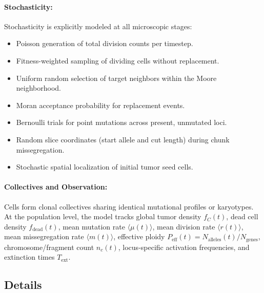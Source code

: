 \documentclass[11pt,a4paper]{article}
\begin{document}
\paragraph{Stochasticity:}
Stochasticity is explicitly modeled at all microscopic stages:
\begin{itemize}
    \item Poisson generation of total division counts per timestep.
    \item Fitness-weighted sampling of dividing cells without replacement.
    \item Uniform random selection of target neighbors within the Moore neighborhood.
    \item Moran acceptance probability for replacement events.
    \item Bernoulli trials for point mutations across present, unmutated loci.
    \item Random slice coordinates (start allele and cut length) during chunk missegregation.
    \item Stochastic spatial localization of initial tumor seed cells.
\end{itemize}

\paragraph{Collectives and Observation:}
Cells form clonal collectives sharing identical mutational profiles or karyotypes. At the population level, the model tracks global tumor density $f_C(t)$, dead cell density $f_{\text{dead}}(t)$, mean mutation rate $\langle \mu(t) \rangle$, mean division rate $\langle r(t) \rangle$, mean missegregation rate $\langle m(t) \rangle$, effective ploidy $P_{\text{eff}}(t) = N_{\text{alleles}}(t)/N_{\text{genes}}$, chromosome/fragment count $n_c(t)$, locus-specific activation frequencies, and extinction times $T_{\text{ext}}$.

\subsection{Details}
\end{document}
